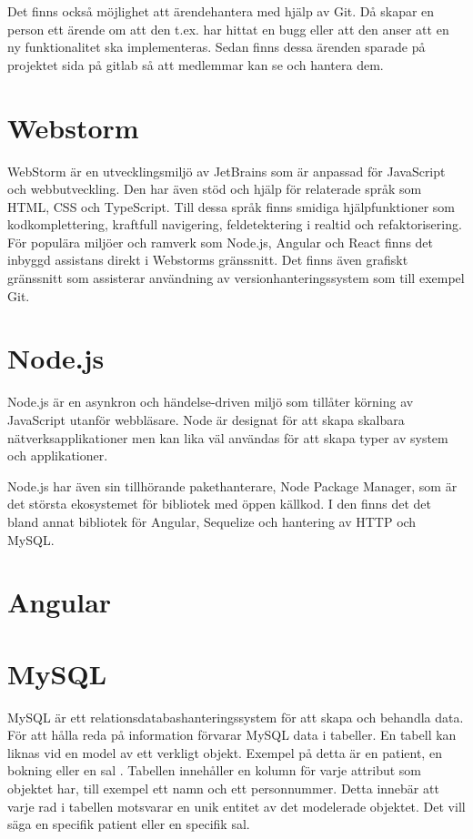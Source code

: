 Det finns också möjlighet att ärendehantera med hjälp av Git.
Då skapar en person ett ärende om att den t.ex. har hittat en bugg eller att den anser att en ny funktionalitet ska implementeras.
Sedan finns dessa ärenden sparade på projektet sida på gitlab så att medlemmar kan se och hantera dem. \cite{gitlab}

\section{Webstorm}
WebStorm är en utvecklingsmiljö av JetBrains som är anpassad för JavaScript och webbutveckling. Den har även stöd och hjälp för relaterade språk som HTML, CSS och TypeScript. Till dessa språk finns smidiga hjälpfunktioner som kodkomplettering, kraftfull navigering, feldetektering i realtid och refaktorisering. För populära miljöer och ramverk som Node.js, Angular och React finns det inbyggd assistans direkt i Webstorms gränssnitt. Det finns även grafiskt gränssnitt som assisterar användning av versionhanteringssystem som till exempel Git.\cite{webstorm}
\section{Node.js}
Node.js är en asynkron och händelse-driven miljö som tillåter körning av JavaScript utanför webbläsare. Node är designat för att skapa skalbara nätverksapplikationer men kan lika väl användas för att skapa typer av system och applikationer. \cite{nodejs}

Node.js har även sin tillhörande pakethanterare, Node Package Manager, som är det största ekosystemet för bibliotek med öppen källkod. \cite{npm}
I den finns det det bland annat bibliotek för Angular, Sequelize och hantering av HTTP och MySQL.

\section{Angular}

\section{MySQL}
MySQL är ett relationsdatabashanteringssystem för att skapa och behandla data. För att hålla reda på 
information förvarar MySQL data i tabeller. En tabell kan liknas vid en model av ett verkligt objekt. 
Exempel på detta är en patient, en bokning eller en sal \cite{mysql}. Tabellen innehåller en kolumn för varje 
attribut som objektet har, till exempel ett namn och ett personnummer. Detta innebär att varje rad i 
tabellen motsvarar en unik entitet av det modelerade objektet. Det vill säga en specifik patient eller 
en specifik sal.

